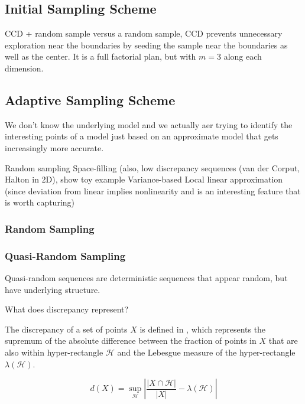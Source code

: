 \documentclass[conference]{IEEEtran}
\begin{document}
	\subsection{Initial Sampling Scheme}
	
	CCD + random sample
	versus a random sample, CCD prevents unnecessary exploration near the boundaries by seeding the sample near the boundaries as well as the center. It is a full factorial plan, but with $m=3$ along each dimension.
	
    \subsection{Adaptive Sampling Scheme}
	
	
	We don't know the underlying model and we actually aer trying to identify the interesting points of a model just based on an approximate model that gets increasingly more accurate.

	Random sampling
	Space-filling (also, low discrepancy sequences (van der Corput, Halton in 2D), show toy example
	Variance-based
	Local linear approximation (since deviation from linear implies nonlinearity and is an interesting feature that is worth capturing)
	
	\subsubsection{Random Sampling}
	
	\subsubsection{Quasi-Random Sampling}
	
	Quasi-random sequences are deterministic sequences that appear random, but have underlying structure. 
	
	What does discrepancy represent? \cite{kuipers1974uniform}
	
	The discrepancy of a set of points $X$ is defined in , which represents the supremum of the absolute difference between the fraction of points in $X$ that are also within hyper-rectangle $\mathcal{H}$ and the Lebesgue measure of the hyper-rectangle $\lambda(\mathcal{H})$.
	
	\begin{equation}
	    \label{eqn:discrepancy}
	    d(X) = \sup_\mathcal{H} \left| \frac{|X \cap \mathcal{H}|}{|X|} - \lambda(\mathcal{H}) \right|
	\end{equation}
\end{document}

